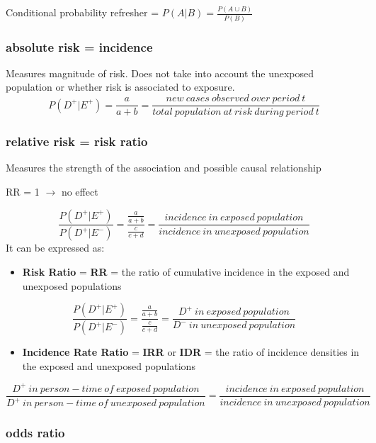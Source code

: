 \documentclass[
]{article}
\providecommand{\tightlist}{%
  \setlength{\itemsep}{0pt}\setlength{\parskip}{0pt}}
\begin{document}
Conditional probability refresher = \(P(A|B)=\frac{P(A \cup B)}{P(B)}\)

\hypertarget{absolute-risk-incidence}{%
\subsubsection{absolute risk =
incidence}\label{absolute-risk-incidence}}

Measures magnitude of risk. Does not take into account the unexposed
population or whether risk is associated to exposure.
\[P(D^+|E^+)=\frac{a}{a+b}=\frac{new\:cases\:observed\:over\:period\:t}{total\:population\:at\:risk\:during\:period\:t}\]

\hypertarget{relative-risk-risk-ratio}{%
\subsubsection{relative risk = risk
ratio}\label{relative-risk-risk-ratio}}

Measures the strength of the association and possible causal
relationship

RR = 1 \(\to\) no effect

\[\frac{P(D^+|E^+)}{P(D^+|E^-)}=\frac{\frac{a}{a+b}}{\frac{c}{c+d}}=\frac{incidence\:in\:exposed\:population}{incidence\:in\:unexposed\:population}\]
It can be expressed as:

\begin{itemize}
\tightlist
\item
  \textbf{Risk Ratio} = \textbf{RR} = the ratio of cumulative incidence
  in the exposed and unexposed populations
\end{itemize}

\[\frac{P(D^+|E^+)}{P(D^+|E^-)}=\frac{\frac{a}{a+b}}{\frac{c}{c+d}}=\frac{D^+\:in\:exposed\:population}{D^-\:in\:unexposed\:population}\]

\begin{itemize}
\tightlist
\item
  \textbf{Incidence Rate Ratio} = \textbf{IRR} or \textbf{IDR} = the
  ratio of incidence densities in the exposed and unexposed populations
\end{itemize}

\[\frac{D^+\:in\:person-time\:of\:exposed\:population}{D^+\:in\:person-time\:of\:unexposed\:population}=\frac{incidence\:in\:exposed\:population}{incidence\:in\:unexposed\:population}\]

\hypertarget{odds-ratio}{%
\subsubsection{odds ratio}\label{odds-ratio}}
\end{document}
